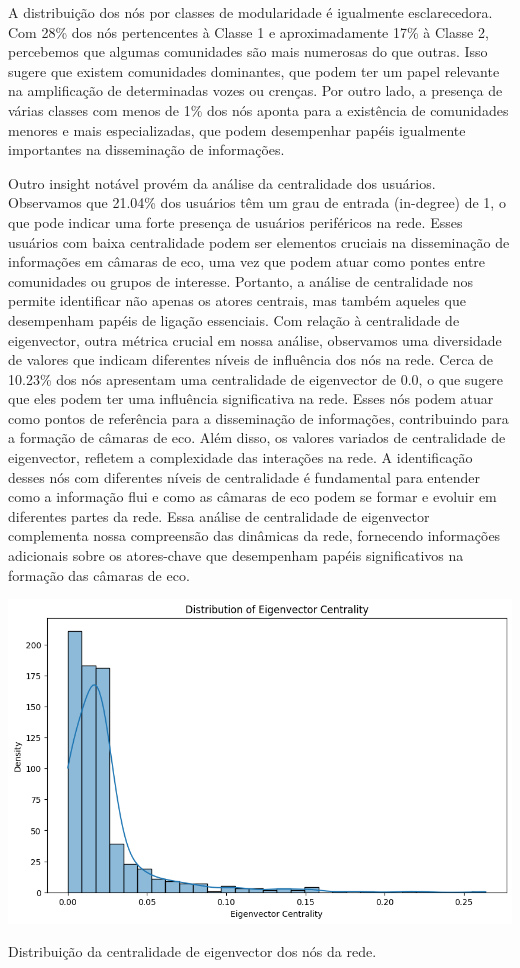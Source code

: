 A distribuição dos nós por classes de modularidade é igualmente esclarecedora. Com 28\% dos nós pertencentes à Classe 1 e aproximadamente 17\% à Classe 2, percebemos que algumas comunidades são mais numerosas do que outras. Isso sugere que existem comunidades dominantes, que podem ter um papel relevante na amplificação de determinadas vozes ou crenças. Por outro lado, a presença de várias classes com menos de 1\% dos nós aponta para a existência de comunidades menores e mais especializadas, que podem desempenhar papéis igualmente importantes na disseminação de informações.

Outro insight notável provém da análise da centralidade dos usuários. Observamos que 21.04\% dos usuários têm um grau de entrada (in-degree) de 1, o que pode indicar uma forte presença de usuários periféricos na rede. Esses usuários com baixa centralidade podem ser elementos cruciais na disseminação de informações em câmaras de eco, uma vez que podem atuar como pontes entre comunidades ou grupos de interesse. Portanto, a análise de centralidade nos permite identificar não apenas os atores centrais, mas também aqueles que desempenham papéis de ligação essenciais. Com relação à centralidade de eigenvector, outra métrica crucial em nossa análise, observamos uma diversidade de valores que indicam diferentes níveis de influência dos nós na rede. Cerca de 10.23\% dos nós apresentam uma centralidade de eigenvector de 0.0, o que sugere que eles podem ter uma influência significativa na rede. Esses nós podem atuar como pontos de referência para a disseminação de informações, contribuindo para a formação de câmaras de eco. Além disso, os valores variados de centralidade de eigenvector, refletem a complexidade das interações na rede. A identificação desses nós com diferentes níveis de centralidade é fundamental para entender como a informação flui e como as câmaras de eco podem se formar e evoluir em diferentes partes da rede. Essa análise de centralidade de eigenvector complementa nossa compreensão das dinâmicas da rede, fornecendo informações adicionais sobre os atores-chave que desempenham papéis significativos na formação das câmaras de eco.

\begin{quadro}[h]
    \centering
    \includegraphics[scale=0.6]{images/eigencentrality.png}
    \caption{Distribuição da centralidade de eigenvector dos nós da rede.}
    \label{fig:eigencentrality}
	\fautor
\end{quadro}

